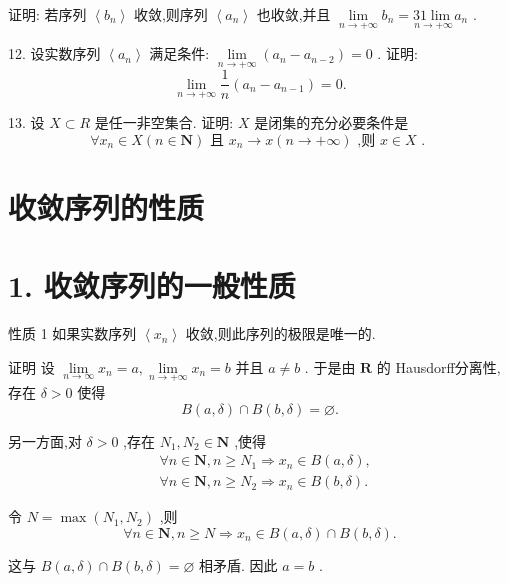 证明: 若序列 $\left\langle  {b}_{n}\right\rangle$ 收敛,则序列 $\left\langle  {a}_{n}\right\rangle$ 也收敛,并且 $\mathop{\lim }\limits_{{n \rightarrow   + \infty }}{b}_{n} = \underset{n \rightarrow   + \infty }{{31}\lim }{a}_{n}$ .

12. 设实数序列 $\left\langle  {a}_{n}\right\rangle$ 满足条件: $\mathop{\lim }\limits_{{n \rightarrow   + \infty }}\left( {{a}_{n} - {a}_{n - 2}}\right)  = 0$ . 证明:
$$\mathop{\lim }\limits_{{n \rightarrow   + \infty }}\frac{1}{n}\left( {{a}_{n} - {a}_{n - 1}}\right)  = 0.$$

13. 设 $X \subset  R$ 是任一非空集合. 证明: $X$ 是闭集的充分必要条件是
$$\forall {x}_{n} \in  X\left( {n \in  \mathbf{N}}\right) \text{ 且 }{x}_{n} \rightarrow  x\left( {n \rightarrow   + \infty }\right) \text{ ,则 }x \in  X\text{ . }$$

\section{收敛序列的性质}

\section*{1. 收敛序列的一般性质}

性质 1 如果实数序列 $\left\langle  {x}_{n}\right\rangle$ 收敛,则此序列的极限是唯一的.

证明 设 $\mathop{\lim }\limits_{{n \rightarrow  \infty }}{x}_{n} = a,\mathop{\lim }\limits_{{n \rightarrow   + \infty }}{x}_{n} = b$ 并且 $a \neq  b$ . 于是由 $\mathbf{R}$ 的 Hausdorff分离性,存在 $\delta  > 0$ 使得
$$B\left( {a,\delta }\right)  \cap  B\left( {b,\delta }\right)  = \varnothing .$$

另一方面,对 $\delta  > 0$ ,存在 ${N}_{1},{N}_{2} \in  \mathbf{N}$ ,使得
\begin{align*}
	&\forall n \in  \mathbf{N},n \geq  {N}_{1} \Rightarrow  {x}_{n} \in  B\left( {a,\delta }\right) ,\\
	&\forall n \in  \mathbf{N},n \geq  {N}_{2} \Rightarrow  {x}_{n} \in  B\left( {b,\delta }\right) .
\end{align*}

令 $N = \max \left( {{N}_{1},{N}_{2}}\right)$ ,则
$$\forall n \in  \mathbf{N},n \geq  N \Rightarrow  {x}_{n} \in  B\left( {a,\delta }\right)  \cap  B\left( {b,\delta }\right) .$$

这与 $B\left( {a,\delta }\right)  \cap  B\left( {b,\delta }\right)  = \varnothing$ 相矛盾. 因此 $a = b$ .

